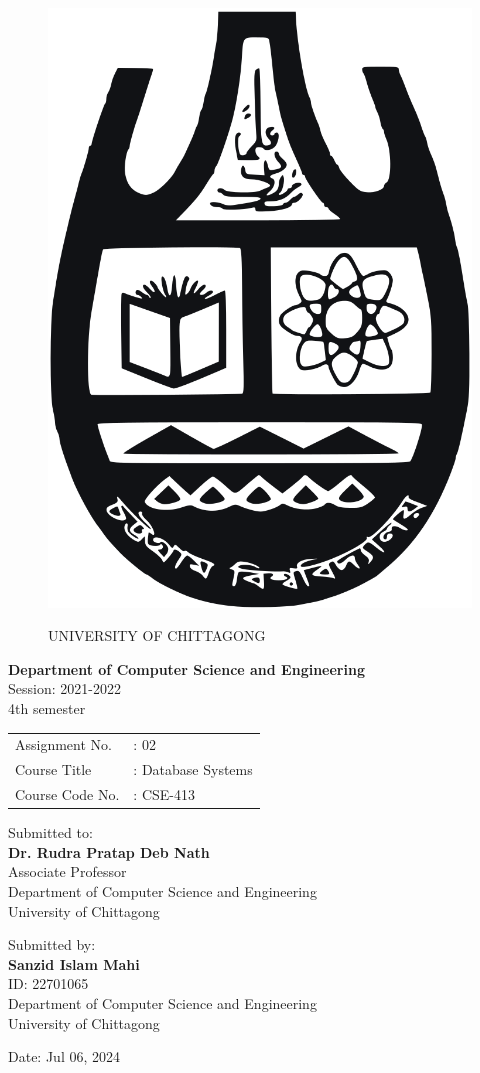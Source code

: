 
\begin{figure}[h]
		\vspace*{-1em}
		\centering
		\includegraphics[width=0.2\linewidth]{university_logo.png}
		\par
		\vspace*{2em}
		{\Large UNIVERSITY OF CHITTAGONG}
\end{figure}
\begin{center}
		\vspace*{3em}
		\textbf{Department of Computer Science and Engineering} \\
		\bigskip
		Session: 2021-2022 \\
		4th semester \\
		\bigskip
		\begin{tabular}{l l}
		  Assignment No. &: 02\\
		  Course Title &: Database Systems \\
		  Course Code No. &: CSE-413 \\
		\end{tabular}
\end{center}

\begin{center}
		\vspace*{3em}
		Submitted to: \\
		\textbf{Dr. Rudra Pratap Deb Nath} \\
		Associate Professor \\
		Department of Computer Science and Engineering \\
		University of Chittagong
\end{center}

\begin{center}
		\vspace*{3em}
		Submitted by: \\
		\textbf{Sanzid Islam Mahi} \\
		ID: 22701065 \\
		Department of Computer Science and Engineering \\
		University of Chittagong
\end{center}




\begin{center}
	\vspace*{3em}
	Date: Jul 06, 2024
\end{center}